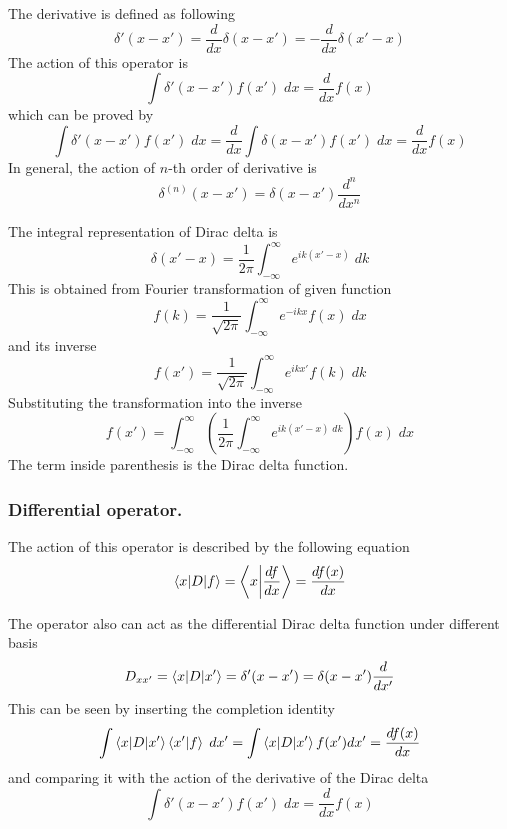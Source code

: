 \documentclass[../main.tex]{subfiles}
\begin{document}
The derivative is defined as following 
\begin{equation*}
	\delta'(x-x')=\frac{d }{dx}\delta(x-x')=-\frac{d }{dx}\delta(x'-x)
\end{equation*}
The action of this operator is 
\begin{equation*}
	\int\delta'(x-x')f(x')\;dx=\frac{d }{dx} f(x)
\end{equation*}
which can be proved by 
\begin{equation*}
	\int\delta'(x-x')f(x')\;dx=\frac{d }{dx }\int\delta(x-x')f(x')\;dx=\frac{d }{dx}f(x)
\end{equation*}
In general, the action of $n$-th order of derivative is 
\begin{equation*}
	\delta^{(n)}(x-x')=\delta(x-x')\frac{d^n }{dx^n}
\end{equation*}

The integral representation of Dirac delta is 
\begin{equation*}
	\delta(x'-x)=\frac{1 }{2\pi} \int_{-\infty}^{\infty} e^{ik(x'-x)}\;dk
\end{equation*}
This is obtained from Fourier transformation of given function
\begin{equation*}
	f(k)=\frac{1 }{\sqrt{2\pi }}\int_{-\infty}^{\infty} e^{-ikx}f(x)\;dx
\end{equation*}
and its inverse
\begin{equation*}
	f(x')=\frac{1 }{\sqrt{2\pi }}\int_{-\infty}^{\infty} e^{ikx'}f(k)\;dk
\end{equation*}
Substituting the transformation into the inverse
\begin{equation*}
	f(x')=\int_{-\infty}^{\infty} \left(\frac{1 }{2\pi}\int_{-\infty}^{\infty} e^{ik(x'-x)\;dk}\right)f(x)\;dx
\end{equation*}
The term inside parenthesis is the Dirac delta function.

\subsubsection*{Differential operator.}
The action of this operator is described by the following equation
\begin{equation*}
	\braket{x|D|f}=\left\langle x\bigg| \frac{df }{dx}\right\rangle=\frac{df(x)}{dx}
\end{equation*}

The operator also can act as the differential Dirac delta function under different basis
\begin{equation*}
	D_{xx'}=\braket{x|D|x'}=\delta'(x-x')=\delta(x-x')\frac{d }{dx'}
\end{equation*}
This can be seen by inserting the completion identity 
\begin{equation*}
	\int \braket{x|D|x'}\braket{x'|f}\;dx'=\int \braket{x|D|x'}f(x')dx'=\frac{df(x)}{dx}
\end{equation*}
and comparing it with the action of the derivative of the Dirac delta
\begin{equation*}
	\int\delta'(x-x')f(x')\;dx=\frac{d }{dx} f(x)
\end{equation*}
\end{document}
